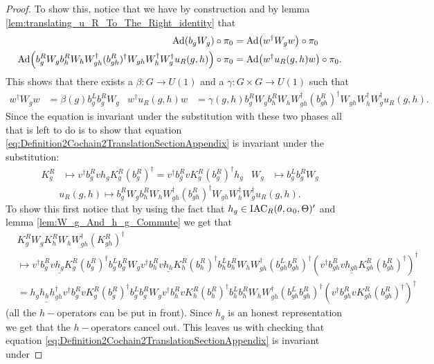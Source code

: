 \documentclass[11pt,a4paper,twoside]{article}
\numberwithin{equation}{section}
\begin{document}
	\begin{proof}
		To show this, notice that we have by construction and by lemma \ref{lem:translating_u_R_To_The_Right_identity} that
		\begin{align}
			\Ad{b_g W_g}\circ\pi_0&=\Ad{w^\dagger W_g w}\circ\pi_0\\
			\Ad{b_g^R W_g b_h^R W_h W_{gh}^\dagger (b_{gh}^R)^\dagger W_{gh}W_h^\dagger W_g^\dagger u_R(g,h)}\circ\pi_0&=\Ad{w^\dagger u_R(g,h) w}\circ\pi_0.
		\end{align}
		This shows that there exists a $\beta:G\rightarrow U(1)$ and a $\gamma:G\times G\rightarrow U(1)$ such that
		\begin{align}
			w^\dagger W_g w&=\beta(g)b_g^Lb_g^RW_g&w^\dagger u_R(g,h) w&=\gamma(g,h)b_g^R W_g b_h^R W_h W_{gh}^\dagger (b_{gh}^R)^\dagger W_{gh}W_h^\dagger W_g^\dagger u_R(g,h).
		\end{align}
		Since the equation is invariant under the substitution with these two phases all that is left to do is to show that equation \eqref{eq:Definition2Cochain2TranslationSectionAppendix} is invariant under the substitution:
		\begin{align}
			K_g^R&\mapsto v^\dagger b_g^R v h_g K_g^R (b_g^R)^\dagger=v^\dagger b_g^R v K_g^R (b_g^R)^\dagger h_g&W_g&\mapsto b_g^Lb_g^RW_g
		\end{align}
		\begin{equation}
			u_R(g,h)\mapsto b_g^R W_g b_h^R W_h W_{gh}^\dagger (b_{gh}^R)^\dagger W_{gh}W_h^\dagger W_g^\dagger u_R(g,h).
		\end{equation}
		To show this first notice that by using the fact that $h_g\in\textrm{IAC}_R(\theta,\alpha_0,\Theta)'$ and lemma \ref{lem:W_g_And_h_g_Commute} we get that
		\begin{align}
			&K_g^R W_g K_h^R W_ hW_{gh}^\dagger(K_{gh}^R)^\dagger\\
			\nonumber
			&\mapsto v^\dagger b_g^R v \underline{h_g} K_g^R (b_g^R)^\dagger b_g^Lb_g^RW_g v^\dagger b_h^R v \underline{h_h} K_h^R (b_h^R)^\dagger b_h^Lb_h^RW_h W_{gh}^\dagger (b_{gh}^Lb_{gh}^R)^\dagger (v^\dagger b_{gh}^R v \underline{h_{gh}} K_{gh}^R (b_{gh}^R)^\dagger)^\dagger\\
			\nonumber
			&=\underline{h_gh_hh_{gh}^\dagger} v^\dagger b_g^R v  K_g^R (b_g^R)^\dagger b_g^Lb_g^RW_g v^\dagger b_h^R v  K_h^R (b_h^R)^\dagger b_h^Lb_h^RW_h W_{gh}^\dagger (b_{gh}^Lb_{gh}^R)^\dagger (v^\dagger b_{gh}^R v  K_{gh}^R (b_{gh}^R)^\dagger)^\dagger
		\end{align}
		(all the $h-$operators can be put in front). Since $h_g$ is an honest representation we get that the $h-$operators cancel out. This leaves us with checking that equation \eqref{eq:Definition2Cochain2TranslationSectionAppendix} is invariant under

\end{proof}
\end{document}
